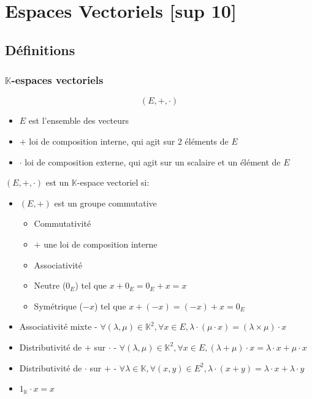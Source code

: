 \documentclass[openany]{book}
\begin{document}
\clearpage

\section{Espaces Vectoriels [sup 10]}
\subsection{Définitions}
\subsubsection{$\mathbb{K}$-espaces vectoriels}
\[ (E, +, \cdot) \]

\begin{itemize}
    \item $E$ est l'ensemble des vecteurs
    \item $+$ loi de composition interne, qui agit sur 2 éléments de $E$
    \item $\cdot$ loi de composition externe, qui agit sur un scalaire et un élément de $E$
\end{itemize}

\noindent $ (E, +, \cdot) $ est un $\mathbb{K}$-espace vectoriel si:
\begin{itemize}
    \item $(E, +)$ est un groupe commutative
        \begin{itemize}
            \item Commutativité
            \item $+$ une loi de composition interne
            \item Associativité
            \item Neutre ($0_E$) tel que $x+0_E = 0_E + x = x$
            \item Symétrique ($-x$) tel que $x+(-x) = (-x) + x = 0_E$
        \end{itemize}
    \item Associativité mixte - $ \forall (\lambda, \mu) \in \mathbb{K}^2, \forall x \in E, \lambda \cdot (\mu \cdot x) = (\lambda \times \mu)\cdot x $
    \item Distributivité de $+$ sur $\cdot$ - $ \forall (\lambda, \mu) \in \mathbb{K}^2, \forall x \in E, (\lambda + \mu) \cdot x = \lambda \cdot x + \mu \cdot x $
    \item Distributivité de $\cdot$ sur $+$ - $ \forall \lambda \in \mathbb{K}, \forall (x, y) \in E^2, \lambda \cdot (x+y) = \lambda \cdot x + \lambda \cdot y $
    \item $ 1_\mathbb{K} \cdot x = x $
\end{itemize}
\end{document}
